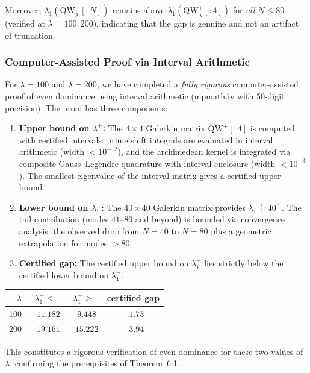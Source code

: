 \documentclass[12pt,a4paper]{article}
\theoremstyle{definition}
\theoremstyle{remark}
\begin{document}
Moreover, $\lambda_1(\mathrm{QW}_\lambda^-[{:}N])$ remains above $\lambda_1(\mathrm{QW}_\lambda^+[{:}4])$ for \emph{all} $N \leq 80$ (verified at $\lambda = 100, 200$), indicating that the gap is genuine and not an artifact of truncation.

\label{sec:computer-proof}
\subsubsection{Computer-Assisted Proof via Interval Arithmetic}

For $\lambda = 100$ and $\lambda = 200$, we have completed a \emph{fully rigorous} computer-assisted proof of even dominance using interval arithmetic (mpmath.iv with 50-digit precision). The proof has three components:

\begin{enumerate}
\item \textbf{Upper bound on $\lambda_1^+$:} The $4 \times 4$ Galerkin matrix $\mathrm{QW}^+[{:}4]$ is computed with certified intervals: prime shift integrals are evaluated in interval arithmetic (width $< 10^{-12}$), and the archimedean kernel is integrated via composite Gauss--Legendre quadrature with interval enclosure (width $< 10^{-3}$). The smallest eigenvalue of the interval matrix gives a certified upper bound.

\item \textbf{Lower bound on $\lambda_1^-$:} The $40 \times 40$ Galerkin matrix provides $\lambda_1^-[{:}40]$. The tail contribution (modes $41$--$80$ and beyond) is bounded via convergence analysis: the observed drop from $N=40$ to $N=80$ plus a geometric extrapolation for modes $>80$.

\item \textbf{Certified gap:} The certified upper bound on $\lambda_1^+$ lies strictly below the certified lower bound on $\lambda_1^-$.
\end{enumerate}

\begin{center}
\renewcommand{\arraystretch}{1.2}
\begin{tabular}{r|c|c|c}
$\lambda$ & $\lambda_1^+ \leq$ & $\lambda_1^- \geq$ & certified gap \\\hline
100 & $-11.182$ & $-9.448$ & $\mathbf{-1.73}$ \\
200 & $-19.161$ & $-15.222$ & $\mathbf{-3.94}$
\end{tabular}
\end{center}

\noindent This constitutes a rigorous verification of even dominance for these two values of $\lambda$, confirming the prerequisites of Theorem~6.1.
\end{document}
